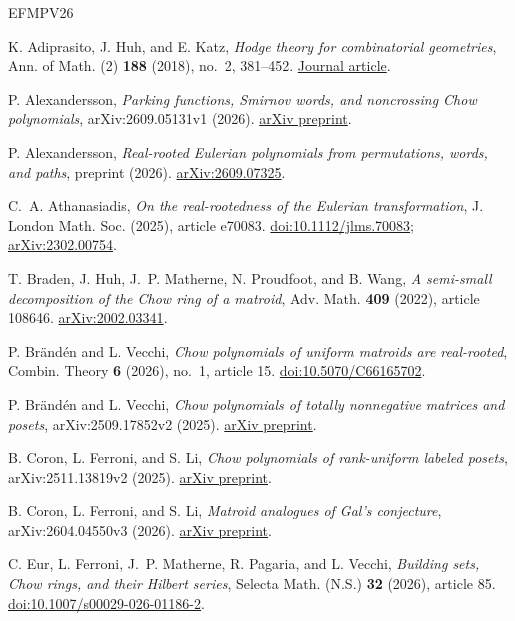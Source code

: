 \documentclass[12pt]{amsart}
\theoremstyle{definition}
\theoremstyle{remark}
\numberwithin{equation}{section}
\begin{document}
\newpage
\renewcommand{\refname}{References / 参考文献}

\begin{thebibliography}{EFMPV26}

K. Adiprasito, J. Huh, and E. Katz,
\emph{Hodge theory for combinatorial geometries},
Ann. of Math. (2) \textbf{188} (2018), no.~2, 381--452.
\href{https://annals.math.princeton.edu/2018/188-2/p01}{Journal article}.

P. Alexandersson,
\emph{Parking functions, Smirnov words, and noncrossing Chow polynomials},
arXiv:2609.05131v1 (2026).
\href{https://arxiv.org/abs/2609.05131}{arXiv preprint}.

P. Alexandersson, \emph{Real-rooted Eulerian polynomials from permutations, words, and paths},
preprint (2026).
\href{https://arxiv.org/abs/2609.07325}{arXiv:2609.07325}.

C.~A. Athanasiadis, \emph{On the real-rootedness of the Eulerian transformation},
J. London Math. Soc. (2025), article e70083.
\href{https://doi.org/10.1112/jlms.70083}{doi:10.1112/jlms.70083};
\href{https://arxiv.org/abs/2302.00754}{arXiv:2302.00754}.

T. Braden, J. Huh, J.~P. Matherne, N. Proudfoot, and B. Wang,
\emph{A semi-small decomposition of the Chow ring of a matroid},
Adv. Math. \textbf{409} (2022), article 108646.
\href{https://arxiv.org/abs/2002.03341}{arXiv:2002.03341}.

P. Br\"and\'en and L. Vecchi,
\emph{Chow polynomials of uniform matroids are real-rooted},
Combin. Theory \textbf{6} (2026), no.~1, article 15.
\href{https://doi.org/10.5070/C66165702}{doi:10.5070/C66165702}.

P. Br\"and\'en and L. Vecchi,
\emph{Chow polynomials of totally nonnegative matrices and posets},
arXiv:2509.17852v2 (2025).
\href{https://arxiv.org/abs/2509.17852}{arXiv preprint}.

B. Coron, L. Ferroni, and S. Li,
\emph{Chow polynomials of rank-uniform labeled posets},
arXiv:2511.13819v2 (2025).
\href{https://arxiv.org/abs/2511.13819}{arXiv preprint}.

B. Coron, L. Ferroni, and S. Li,
\emph{Matroid analogues of Gal's conjecture},
arXiv:2604.04550v3 (2026).
\href{https://arxiv.org/abs/2604.04550}{arXiv preprint}.

C. Eur, L. Ferroni, J.~P. Matherne, R. Pagaria, and L. Vecchi,
\emph{Building sets, Chow rings, and their Hilbert series},
Selecta Math. (N.S.) \textbf{32} (2026), article 85.
\href{https://doi.org/10.1007/s00029-026-01186-2}{doi:10.1007/s00029-026-01186-2}.


\end{thebibliography}
\end{document}
